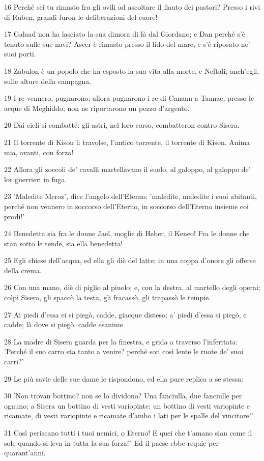 \par 16 Perché sei tu rimasto fra gli ovili ad ascoltare il flauto dei pastori? Presso i rivi di Ruben, grandi furon le deliberazioni del cuore!
\par 17 Galaad non ha lasciato la sua dimora di là dal Giordano; e Dan perché s'è tenuto sulle sue navi? Ascer è rimasto presso il lido del mare, e s'è riposato ne' suoi porti.
\par 18 Zabulon è un popolo che ha esposto la sua vita alla morte, e Neftali, anch'egli, sulle alture della campagna.
\par 19 I re vennero, pugnarono; allora pugnarono i re di Canaan a Taanac, presso le acque di Meghiddo; non ne riportarono un pezzo d'argento.
\par 20 Dai cieli si combatté: gli astri, nel loro corso, combatteron contro Sisera.
\par 21 Il torrente di Kison li travolse, l'antico torrente, il torrente di Kison. Anima mia, avanti, con forza!
\par 22 Allora gli zoccoli de' cavalli martellavano il suolo, al galoppo, al galoppo de' lor guerrieri in fuga.
\par 23 'Maledite Meroz', dice l'angelo dell'Eterno: 'maledite, maledite i suoi abitanti, perché non vennero in soccorso dell'Eterno, in soccorso dell'Eterno insieme coi prodi!'
\par 24 Benedetta sia fra le donne Jael, moglie di Heber, il Keneo! Fra le donne che stan sotto le tende, sia ella benedetta!
\par 25 Egli chiese dell'acqua, ed ella gli diè del latte; in una coppa d'onore gli offerse della crema.
\par 26 Con una mano, diè di piglio al piuolo; e, con la destra, al martello degli operai; colpì Sisera, gli spaccò la testa, gli fracassò, gli trapassò le tempie.
\par 27 Ai piedi d'essa ei si piegò, cadde, giacque disteso; a' piedi d'essa si piegò, e cadde; là dove si piegò, cadde esanime.
\par 28 La madre di Sisera guarda per la finestra, e grida a traverso l'inferriata: 'Perché il suo carro sta tanto a venire? perché son così lente le ruote de' suoi carri?'
\par 29 Le più savie delle sue dame le rispondono, ed ella pure replica a se stessa:
\par 30 'Non trovan bottino? non se lo dividono? Una fanciulla, due fanciulle per ognuno; a Sisera un bottino di vesti variopinte; un bottino di vesti variopinte e ricamate, di vesti variopinte e ricamate d'ambo i lati per le spalle del vincitore!'
\par 31 Così periscano tutti i tuoi nemici, o Eterno! E quei che t'amano sian come il sole quando si leva in tutta la sua forza!" Ed il paese ebbe requie per quarant'anni.


